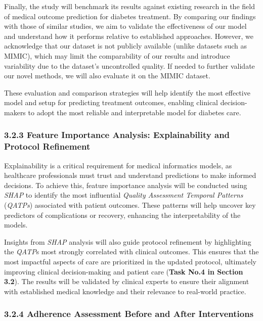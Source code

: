 \documentclass[
]{article}
\begin{document}
Finally, the study will benchmark its results against existing research
in the field of medical outcome prediction for diabetes treatment. By
comparing our findings with those of similar studies, we aim to validate
the effectiveness of our model and understand how it performs relative
to established approaches. However, we acknowledge that our dataset is
not publicly available (unlike datasets such as MIMIC), which may limit
the comparability of our results and introduce variability due to the
dataset's uncontrolled quality. If needed to further validate our novel
methods, we will also evaluate it on the MIMIC dataset.

These evaluation and comparison strategies will help identify the most
effective model and setup for predicting treatment outcomes, enabling
clinical decision-makers to adopt the most reliable and interpretable
model for diabetes care.

\subsubsection{3.2.3 Feature Importance Analysis: Explainability and
Protocol
Refinement}\label{feature-importance-analysis-explainability-and-protocol-refinement}

Explainability is a critical requirement for medical informatics models,
as healthcare professionals must trust and understand predictions to
make informed decisions. To achieve this, feature importance analysis
will be conducted using \emph{SHAP} to identify the most influential
\emph{Quality Assessment Temporal Patterns} (\emph{QATPs}) associated
with patient outcomes. These patterns will help uncover key predictors
of complications or recovery, enhancing the interpretability of the
models.

Insights from \emph{SHAP} analysis will also guide protocol refinement
by highlighting the \emph{QATP}s most strongly correlated with clinical
outcomes. This ensures that the most impactful aspects of care are
prioritized in the updated protocol, ultimately improving clinical
decision-making and patient care (\textbf{Task No.4 in Section 3.2}).
The results will be validated by clinical experts to ensure their
alignment with established medical knowledge and their relevance to
real-world practice.

\subsubsection{3.2.4 Adherence Assessment Before and After
Interventions}\label{adherence-assessment-before-and-after-interventions}
\end{document}
